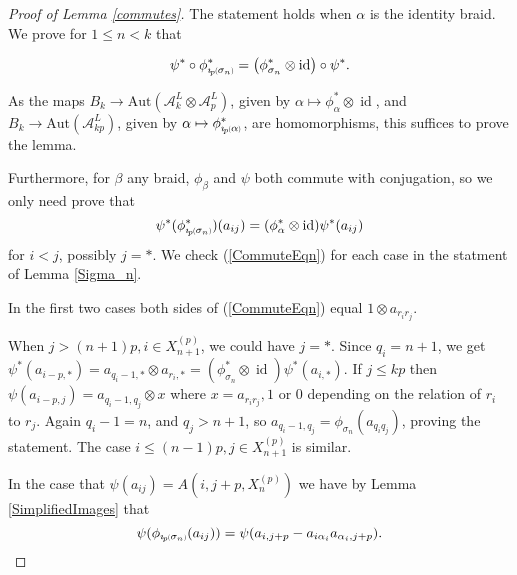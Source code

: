 \documentclass[11pt]{amsart}
\def\A{{\mathcal A}}
\def\s{{\sigma}}
\def\a{\alpha}
\newcommand*{\subsmallp}[1]{\scalebox{.5}{\ensuremath#1}}
\newcommand{\subpp}[2][p]{\imath_{\hspace*{-1pt}#1}\hspace*{-.5pt}\subsmallp(#2\subsmallp)}
\newcommand\id{\operatorname{id}}
\theoremstyle{definition}
\newtheorem{rem}[thm]{Remark}
\begin{document}
\begin{proof} [Proof of Lemma \ref{commutes}]
The statement holds when $\alpha$ is the identity braid. We prove for $1\le n < k$ that

$$\psi^\ast\circ\phi^\ast_{\subpp{\s_n}} = \left(\phi^\ast_{\s_n}\otimes \id\right)\circ\psi^\ast.$$

As the maps $B_{k} \to \text{Aut}(\A_k^L\otimes\A_p^L)$, given by $\alpha \mapsto \phi^\ast_\alpha\otimes\id$, and $B_k \to \text{Aut}(\A_{kp}^L)$, given by $\alpha \mapsto \phi^\ast_{\subpp\alpha}$, are homomorphisms, this suffices to prove the lemma. %

Furthermore, for $\beta$ any braid, $\phi_\beta$ and $\psi$ both commute with conjugation, so we only need prove that 
      \begin{equation}\label{CommuteEqn}
      \psi^\ast(\phi^\ast_{\subpp{\s_n}})(a_{ij})=(\phi^\ast_\alpha\otimes\id)\psi^\ast(a_{ij})
      \end{equation}
for $i<j$, possibly $j=\ast$. We check (\ref{CommuteEqn}) for each case in the statment of Lemma \ref{Sigma_n}. 

In the first two cases both sides of (\ref{CommuteEqn}) equal $1\otimes a_{r_ir_j}$. 

When $j>(n+1)p, i\in X_{n+1}^{(p)}$, we could have $j=\ast$. Since $q_i=n+1$, we get $\psi^\ast(a_{i-p,\ast})=a_{q_i-1,\ast}\otimes a_{r_i,\ast}=(\phi^\ast_{\s_n}\otimes\id)\psi^\ast(a_{i,\ast})$. If $j\le kp$ then $\psi(a_{i-p,j}) = a_{q_i-1,q_j}\otimes x$ where $x=a_{r_ir_j}, 1$ or $0$ depending on the relation of $r_i$ to $r_j$. Again $q_i-1=n$, and $q_j>n+1$, so $a_{q_i-1,q_j}=\phi_{\s_n}(a_{q_iq_j})$, proving the statement. The case $i\le (n-1)p,j\in X_{n+1}^{(p)}$ is similar.

In the case that $\psi(a_{ij}) = A(i,j+p,X_n^{(p)})$ we have by Lemma \ref{SimplifiedImages} that
$$\psi(\phi_{\subpp{\s_n}}(a_{ij})) = \psi(a_{i,j+p}-a_{i\a_i}a_{\a_i,j+p}).$$



\end{proof}
\end{document}

